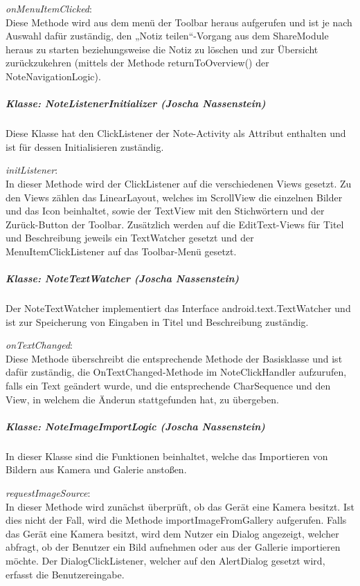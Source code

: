 \textit{onMenuItemClicked}:\\
Diese Methode wird aus dem menü der Toolbar heraus aufgerufen und ist je nach Auswahl dafür zuständig, den „Notiz teilen“-Vorgang aus dem ShareModule heraus zu starten beziehungsweise die Notiz zu löschen und zur Übersicht zurückzukehren (mittels der Methode returnToOverview() der NoteNavigationLogic).

\subparagraph*{Klasse: NoteListenerInitializer (Joscha Nassenstein)}
Diese Klasse hat den ClickListener der Note-Activity als Attribut enthalten und ist für dessen Initialisieren zuständig.

\textit{initListener}:\\
In dieser Methode wird der ClickListener auf die verschiedenen Views gesetzt. Zu den Views zählen das LinearLayout, welches im ScrollView die einzelnen Bilder und das Icon beinhaltet, sowie der TextView mit den Stichwörtern und der Zurück-Button der Toolbar. Zusätzlich werden auf die EditText-Views für Titel und Beschreibung jeweils ein TextWatcher gesetzt und der MenuItemClickListener auf das Toolbar-Menü gesetzt.

\subparagraph*{Klasse: NoteTextWatcher (Joscha Nassenstein)}
Der NoteTextWatcher implementiert das Interface android.text.TextWatcher und ist zur Speicherung von Eingaben in Titel und Beschreibung zuständig.

\textit{onTextChanged}:\\
Diese Methode überschreibt die entsprechende Methode der Basisklasse und ist dafür zuständig, die OnTextChanged-Methode im NoteClickHandler aufzurufen, falls ein Text geändert wurde, und die entsprechende CharSequence und den View, in welchem die Änderun stattgefunden hat, zu übergeben.

\subparagraph*{Klasse: NoteImageImportLogic (Joscha Nassenstein)}
In dieser Klasse sind die Funktionen beinhaltet, welche das Importieren von Bildern aus Kamera und Galerie anstoßen.

\textit{requestImageSource}:\\
In dieser Methode wird zunächst überprüft, ob das Gerät eine Kamera besitzt. Ist dies nicht der Fall, wird die Methode importImageFromGallery aufgerufen. Falls das Gerät eine Kamera besitzt, wird dem Nutzer ein Dialog angezeigt, welcher abfragt, ob der Benutzer ein Bild aufnehmen oder aus der Gallerie importieren möchte. Der DialogClickListener, welcher auf den AlertDialog gesetzt wird, erfasst die Benutzereingabe.

